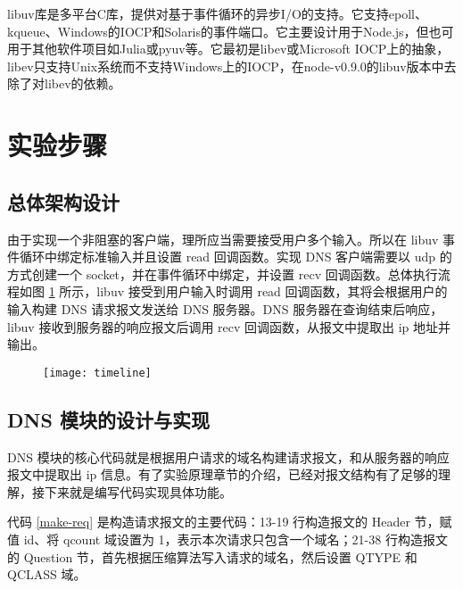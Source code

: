 \documentclass[a4paper,11pt,UTF8,AutoFakeBold= {2.88}]{ctexart}
\begin{document}
libuv库是多平台C库，提供对基于事件循环的异步I/O的支持。它支持epoll、kqueue、Windows的IOCP和Solaris的事件端口。它主要设计用于Node.js，但也可用于其他软件项目如Julia或pyuv等。它最初是libev或Microsoft IOCP上的抽象，libev只支持Unix系统而不支持Windows上的IOCP，在node-v0.9.0的libuv版本中去除了对libev的依赖。

\section{实验步骤}

\subsection{总体架构设计}

由于实现一个非阻塞的客户端，理所应当需要接受用户多个输入。所以在 libuv 事件循环中绑定标准输入并且设置 read 回调函数。实现 DNS 客户端需要以 udp 的方式创建一个 socket，并在事件循环中绑定，并设置 recv 回调函数。总体执行流程如图 \ref{timeline} 所示，libuv 接受到用户输入时调用 read 回调函数，其将会根据用户的输入构建 DNS 请求报文发送给 DNS 服务器。DNS 服务器在查询结束后响应，libuv 接收到服务器的响应报文后调用 recv 回调函数，从报文中提取出 ip 地址并输出。

\begin{figure}[!htbp]
    \centering
    \texttt{[image: timeline]}
    \label{timeline}
    \end{figure}

\subsection{DNS 模块的设计与实现}

DNS 模块的核心代码就是根据用户请求的域名构建请求报文，和从服务器的响应报文中提取出 ip 信息。有了实验原理章节的介绍，已经对报文结构有了足够的理解，接下来就是编写代码实现具体功能。

代码 \ref{make-req} 是构造请求报文的主要代码：13-19 行构造报文的 Header 节，赋值 id、将 qcount 域设置为 1，表示本次请求只包含一个域名；21-38 行构造报文的 Question 节，首先根据压缩算法写入请求的域名，然后设置 QTYPE 和 QCLASS 域。
\end{document}

